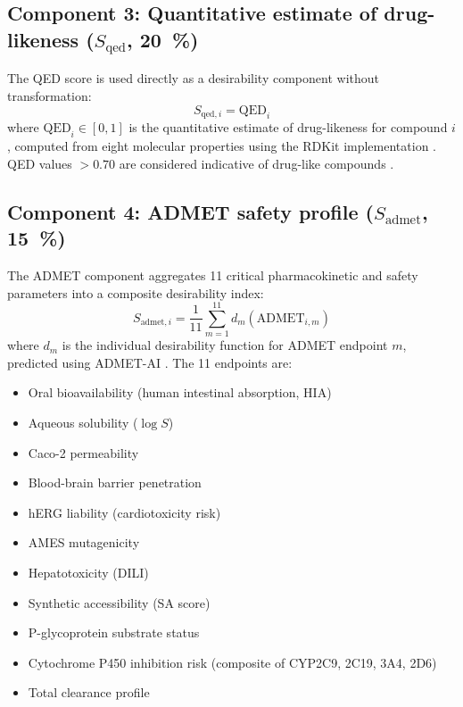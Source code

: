 \documentclass[journal=jcisd8,manuscript=suppinfo]{achemso}
\begin{document}
\subsection*{Component 3: Quantitative estimate of drug-likeness ($S_{\text{qed}}$, \qty{20}{\percent})}

The QED score is used directly as a desirability component without transformation:
\begin{equation}
S_{\text{qed}, i} = \text{QED}_i
\label{eq:qed}
\end{equation}
where $\text{QED}_i \in [\num{0}, \num{1}]$ is the quantitative estimate of drug-likeness for compound $i$, computed from eight molecular properties using the RDKit implementation \cite{GregLandrum2025}. QED values $> \num{0.70}$ are considered indicative of drug-like compounds \cite{Lipinski2004}.

\subsection*{Component 4: ADMET safety profile ($S_{\text{admet}}$, \qty{15}{\percent})}

The ADMET component aggregates \num{11} critical pharmacokinetic and safety parameters into a composite desirability index:
\begin{equation}
S_{\text{admet}, i} = \frac{1}{11} \sum_{m=1}^{11} d_m(\text{ADMET}_{i,m})
\label{eq:admet}
\end{equation}
where $d_m$ is the individual desirability function for ADMET endpoint $m$, predicted using ADMET-AI \cite{Swanson2024}. The \num{11} endpoints are:

\begin{itemize}
\item Oral bioavailability (human intestinal absorption, HIA)
\item Aqueous solubility ($\log S$)
\item Caco-2 permeability
\item Blood-brain barrier penetration
\item hERG liability (cardiotoxicity risk)
\item AMES mutagenicity
\item Hepatotoxicity (DILI)
\item Synthetic accessibility (SA score)
\item P-glycoprotein substrate status
\item Cytochrome P450 inhibition risk (composite of CYP2C9, 2C19, 3A4, 2D6)
\item Total clearance profile
\end{itemize}
\end{document}
